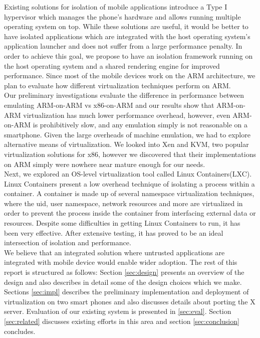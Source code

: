 Existing solutions for isolation of mobile applications introduce a Type I hypervisor \cite{mvp, okl4} which manages the phone's hardware and allows running multiple operating system on top. While these solutions are useful, it would be better to have isolated applications which are integrated with the host operating system's application launcher and does not suffer from a large performance penalty. In order to achieve this goal, we propose to have an isolation framework running on the host operating system and a shared rendering engine for improved performance. Since most of the mobile devices work on the ARM architecture, we plan to evaluate how different virtualization techniques perform on ARM.\\

Our preliminary investigations evaluate the difference in performance between emulating ARM-on-ARM vs x86-on-ARM and our results show that ARM-on-ARM virtualization has much lower performance overhead, however, even ARM-on-ARM is prohibitively slow, and any emulation simply is not reasonable on a smartphone.  Given the large overheads of machine emulation, we had to explore alternative means of virtualization.  We looked into Xen and KVM, two popular virtualization solutions for x86, however we discovered that their implementations on ARM simply were nowhere near mature enough for our needs. \\

Next, we explored an OS-level virtualization tool called Linux Containers(LXC). Linux Containers present a low overhead technique of isolating a process within a container.  A container is made up of several namespace virtualization techniques, where the uid, user namespace, network resources and more are virtualized in order to prevent the process inside the container from interfacing external data or resources.  Despite some difficulties in getting Linux Containers to run, it has been very effective.  After extensive testing, it has proved to be an ideal intersection of isolation and performance. \\

We believe that an integrated solution where untrusted applications are integrated with mobile device would enable wider adoption. The rest of this report is structured as follows: Section \ref{sec:design} presents an overview of the design and also describes in detail some of the design choices which we make. Sections \ref{sec:impl} describes the preliminary implementation and deployment of virtualization on two smart phones and also discusses details about porting the X server. Evaluation of our existing system is presented in \ref{sec:eval}. Section \ref{sec:related} discusses existing efforts in this area and section \ref{sec:conclusion} concludes. \\

